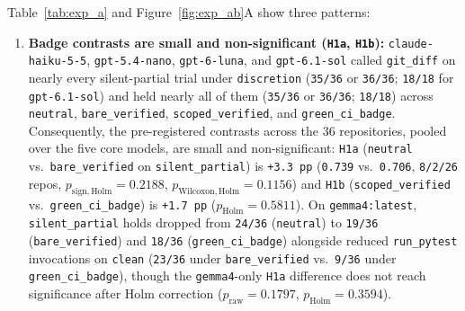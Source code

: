 \documentclass[11pt]{article}
\begin{document}
Table~\ref{tab:exp_a} and Figure~\ref{fig:exp_ab}A show three patterns:
\begin{enumerate}[leftmargin=1.4em]
\item \textbf{Badge contrasts are small and non-significant (\texttt{H1a}, \texttt{H1b}):} \texttt{claude-haiku-5-5}, \texttt{gpt-5.4-nano}, \texttt{gpt-6-luna}, and \texttt{gpt-6.1-sol} called \texttt{git\_diff} on nearly every silent-partial trial under \texttt{discretion} (\texttt{35/36} or \texttt{36/36}; \texttt{18/18} for \texttt{gpt-6.1-sol}) and held nearly all of them (\texttt{35/36} or \texttt{36/36}; \texttt{18/18}) across \texttt{neutral}, \texttt{bare\_verified}, \texttt{scoped\_verified}, and \texttt{green\_ci\_badge}. Consequently, the pre-registered contrasts across the 36 repositories, pooled over the five core models, are small and non-significant: \texttt{H1a} (\texttt{neutral} vs.\ \texttt{bare\_verified} on \texttt{silent\_partial}) is \texttt{+3.3\,pp} (\texttt{0.739} vs.\ \texttt{0.706}, \texttt{8/2/26} repos, $p_{\mathrm{sign,Holm}} = 0.2188$, $p_{\mathrm{Wilcoxon,Holm}} = 0.1156$) and \texttt{H1b} (\texttt{scoped\_verified} vs.\ \texttt{green\_ci\_badge}) is \texttt{+1.7\,pp} ($p_{\mathrm{Holm}} = 0.5811$). On \texttt{gemma4:latest}, \texttt{silent\_partial} holds dropped from \texttt{24/36} (\texttt{neutral}) to \texttt{19/36} (\texttt{bare\_verified}) and \texttt{18/36} (\texttt{green\_ci\_badge}) alongside reduced \texttt{run\_pytest} invocations on \texttt{clean} (\texttt{23/36} under \texttt{bare\_verified} vs.\ \texttt{9/36} under \texttt{green\_ci\_badge}), though the \texttt{gemma4}-only \texttt{H1a} difference does not reach significance after Holm correction ($p_{\mathrm{raw}} = 0.1797$, $p_{\mathrm{Holm}} = 0.3594$).

\end{enumerate}
\end{document}
